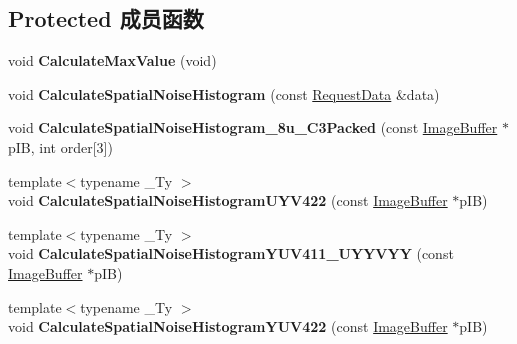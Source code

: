 \subsection*{Protected 成员函数}
\begin{DoxyCompactItemize}
\item 
\hypertarget{class_histogram_canvas_a5f5fd72b98f5f933560ae349f181fec3}{void {\bfseries Calculate\+Max\+Value} (void)}\label{class_histogram_canvas_a5f5fd72b98f5f933560ae349f181fec3}

\item 
\hypertarget{class_histogram_canvas_ab953b8f150658759e9293d81f3725bc3}{void {\bfseries Calculate\+Spatial\+Noise\+Histogram} (const \hyperlink{struct_request_data}{Request\+Data} \&data)}\label{class_histogram_canvas_ab953b8f150658759e9293d81f3725bc3}

\item 
\hypertarget{class_histogram_canvas_ac2b3749563c0af872ce20cbd76a6f5fb}{void {\bfseries Calculate\+Spatial\+Noise\+Histogram\+\_\+8u\+\_\+\+C3\+Packed} (const \hyperlink{struct_image_buffer}{Image\+Buffer} $\ast$p\+I\+B, int order\mbox{[}3\mbox{]})}\label{class_histogram_canvas_ac2b3749563c0af872ce20cbd76a6f5fb}

\item 
\hypertarget{class_histogram_canvas_a8aaea0e4488555a302d85813e441a439}{{\footnotesize template$<$typename \+\_\+\+Ty $>$ }\\void {\bfseries Calculate\+Spatial\+Noise\+Histogram\+U\+Y\+V422} (const \hyperlink{struct_image_buffer}{Image\+Buffer} $\ast$p\+I\+B)}\label{class_histogram_canvas_a8aaea0e4488555a302d85813e441a439}

\item 
\hypertarget{class_histogram_canvas_a7fa2fe1707992d26e183f41a64cddfa0}{{\footnotesize template$<$typename \+\_\+\+Ty $>$ }\\void {\bfseries Calculate\+Spatial\+Noise\+Histogram\+Y\+U\+V411\+\_\+\+U\+Y\+Y\+V\+Y\+Y} (const \hyperlink{struct_image_buffer}{Image\+Buffer} $\ast$p\+I\+B)}\label{class_histogram_canvas_a7fa2fe1707992d26e183f41a64cddfa0}

\item 
\hypertarget{class_histogram_canvas_a474c27c34e1173fdf6712be2077ffe04}{{\footnotesize template$<$typename \+\_\+\+Ty $>$ }\\void {\bfseries Calculate\+Spatial\+Noise\+Histogram\+Y\+U\+V422} (const \hyperlink{struct_image_buffer}{Image\+Buffer} $\ast$p\+I\+B)}\label{class_histogram_canvas_a474c27c34e1173fdf6712be2077ffe04}


\end{DoxyCompactItemize}
